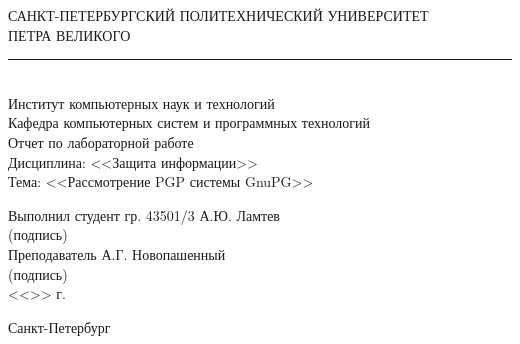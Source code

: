 \begin{titlepage}
\begin{center}
	САНКТ-ПЕТЕРБУРГСКИЙ ПОЛИТЕХНИЧЕСКИЙ УНИВЕРСИТЕТ\\ ПЕТРА ВЕЛИКОГО\\[0.3cm]
	\par\noindent\rule{10cm}{0.4pt}\\[0.3cm]
	Институт компьютерных наук и технологий \\[0.3cm]
	Кафедра компьютерных систем и программных технологий\\[4cm]
	
	Отчет по лабораторной работе\\[3mm]
	Дисциплина: <<Защита информации>>\\[3mm]
	Тема: <<Рассмотрение PGP системы GnuPG>>\\[7cm]
\end{center}

\begin{flushleft}
	\hspace*{5mm} Выполнил студент гр. 43501/3  \hspace*{1.5cm}\sign[3cm]\hfill А.Ю. Ламтев\\
	\hspace*{9.4cm} (подпись)\\[3mm]
	\hspace*{5mm} Преподаватель \hspace*{5.0cm}\sign[3cm]\hfill А.Г. Новопашенный\\
	\hspace*{9.4cm} (подпись)\\[5mm]
	\hspace*{11.1cm} <<\sign[7mm]>> \sign[27mm] \the\year\hspace{1mm} г.
\end{flushleft}

\vfill

\begin{center}
	Санкт-Петербург\\
	\the\year
\end{center}
\end{titlepage}
\addtocounter{page}{1}